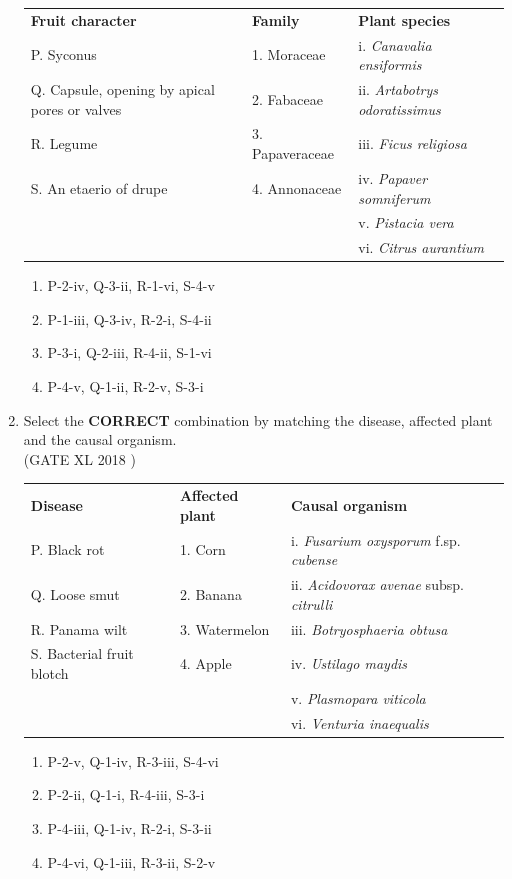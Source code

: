 \documentclass[14pt]{extarticle}
\begin{document}
\begin{flushleft}
\begin{enumerate}[leftmargin=*]
\begin{tabular}{p{4cm} p{4cm} p{6cm}}
\textbf{Fruit character} & \textbf{Family} & \textbf{Plant species} \\
P. Syconus & 1. Moraceae & i. \textit{Canavalia ensiformis} \\
Q. Capsule, opening by apical pores or valves & 2. Fabaceae & ii. \textit{Artabotrys odoratissimus} \\
R. Legume & 3. Papaveraceae & iii. \textit{Ficus religiosa} \\
S. An etaerio of drupe & 4. Annonaceae & iv. \textit{Papaver somniferum} \\
 & & v. \textit{Pistacia vera} \\
 & & vi. \textit{Citrus aurantium} \\
\end{tabular}

\begin{enumerate}[label=(\Alph*)]
    \item P-2-iv, Q-3-ii, R-1-vi, S-4-v
    \item P-1-iii, Q-3-iv, R-2-i, S-4-ii
    \item P-3-i, Q-2-iii, R-4-ii, S-1-vi
    \item P-4-v, Q-1-ii, R-2-v, S-3-i
\end{enumerate}


\item  Select the \textbf{CORRECT} combination by matching the disease, affected plant and the causal organism.\\
\hfill(GATE XL 2018 )
\begin{tabular}{p{3.5cm} p{3cm} p{7cm}}
\textbf{Disease} & \textbf{Affected plant} & \textbf{Causal organism} \\
P. Black rot & 1. Corn & i. \textit{Fusarium oxysporum} f.sp. \textit{cubense} \\
Q. Loose smut & 2. Banana & ii. \textit{Acidovorax avenae} subsp. \textit{citrulli} \\
R. Panama wilt & 3. Watermelon & iii. \textit{Botryosphaeria obtusa} \\
S. Bacterial fruit blotch & 4. Apple & iv. \textit{Ustilago maydis} \\
 & & v. \textit{Plasmopara viticola} \\
 & & vi. \textit{Venturia inaequalis} \\
\end{tabular}

\begin{enumerate}[label=(\Alph*)]
    \item P-2-v, Q-1-iv, R-3-iii, S-4-vi
    \item P-2-ii, Q-1-i, R-4-iii, S-3-i
    \item P-4-iii, Q-1-iv, R-2-i, S-3-ii
    \item P-4-vi, Q-1-iii, R-3-ii, S-2-v
\end{enumerate}


\end{enumerate}
\end{flushleft}
\end{document}
